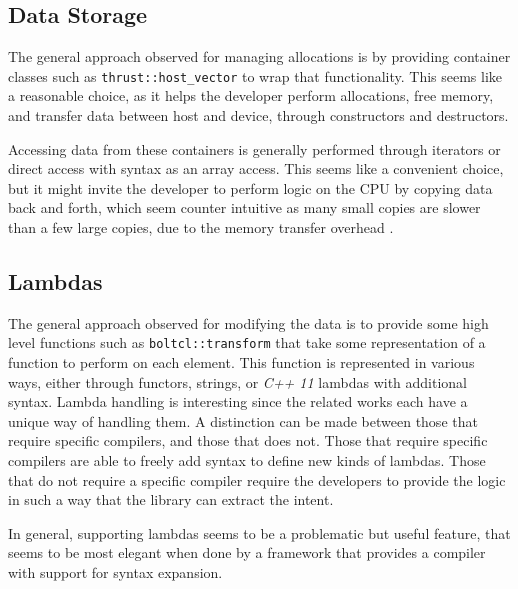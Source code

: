\subsection{Data Storage}
The general approach observed for managing allocations is by providing container classes such as \texttt{thrust::host\_vector} to wrap that functionality. This seems like a reasonable choice, as it helps the developer perform allocations, free memory, and transfer data between host and device, through constructors and destructors.

Accessing data from these containers is generally performed through iterators or direct access with syntax as an array access. This seems like a convenient choice, but it might invite the developer to perform logic on the CPU by copying data back and forth, which seem counter intuitive as many small copies are slower than a few large copies, due to the memory transfer overhead \cite{memoryTransferOverhead}.

\subsection{Lambdas}
The general approach observed for modifying the data is to provide some high level functions such as \texttt{boltcl::transform} that take some representation of a function to perform on each element. This function is represented in various ways, either through functors, strings, or \textit{C++ 11} lambdas with additional syntax. Lambda handling is interesting since the related works each have a unique way of handling them. A distinction can be made between those that require specific compilers, and those that does not. Those that require specific compilers are able to freely add syntax to define new kinds of lambdas. Those that do not require a specific compiler require the developers to provide the logic in such a way that the library can extract the intent.

In general, supporting lambdas seems to be a problematic but useful feature, that seems to be most elegant when done by a framework that provides a compiler with support for syntax expansion.